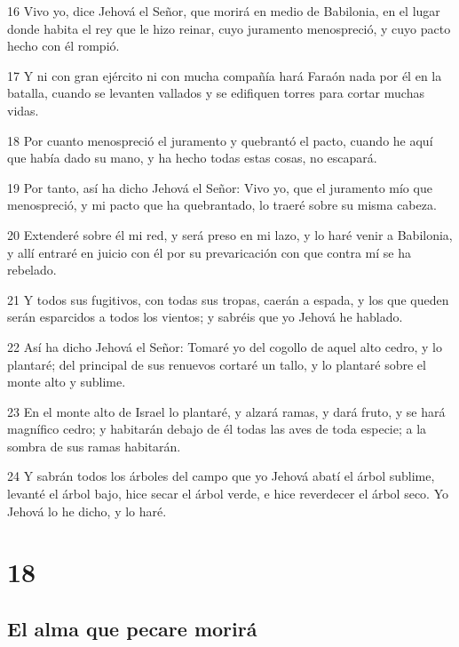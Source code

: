 \par 16 Vivo yo, dice Jehová el Señor, que morirá en medio de Babilonia, en el lugar donde habita el rey que le hizo reinar, cuyo juramento menospreció, y cuyo pacto hecho con él rompió.
\par 17 Y ni con gran ejército ni con mucha compañía hará Faraón nada por él en la batalla, cuando se levanten vallados y se edifiquen torres para cortar muchas vidas.
\par 18 Por cuanto menospreció el juramento y quebrantó el pacto, cuando he aquí que había dado su mano, y ha hecho todas estas cosas, no escapará.
\par 19 Por tanto, así ha dicho Jehová el Señor: Vivo yo, que el juramento mío que menospreció, y mi pacto que ha quebrantado, lo traeré sobre su misma cabeza.
\par 20 Extenderé sobre él mi red, y será preso en mi lazo, y lo haré venir a Babilonia, y allí entraré en juicio con él por su prevaricación con que contra mí se ha rebelado.
\par 21 Y todos sus fugitivos, con todas sus tropas, caerán a espada, y los que queden serán esparcidos a todos los vientos; y sabréis que yo Jehová he hablado.
\par 22 Así ha dicho Jehová el Señor: Tomaré yo del cogollo de aquel alto cedro, y lo plantaré; del principal de sus renuevos cortaré un tallo, y lo plantaré sobre el monte alto y sublime.
\par 23 En el monte alto de Israel lo plantaré, y alzará ramas, y dará fruto, y se hará magnífico cedro; y habitarán debajo de él todas las aves de toda especie; a la sombra de sus ramas habitarán.
\par 24 Y sabrán todos los árboles del campo que yo Jehová abatí el árbol sublime, levanté el árbol bajo, hice secar el árbol verde, e hice reverdecer el árbol seco. Yo Jehová lo he dicho, y lo haré.

\chapter{18}

\section*{El alma que pecare morirá}

